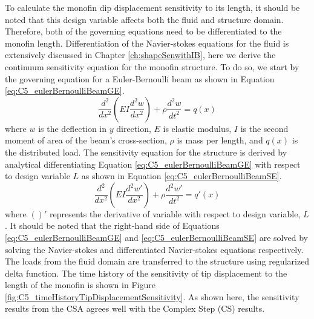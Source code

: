 %
To calculate the monofin dip displacement sensitivity to its length, it should be noted that this design variable affects both the fluid and structure domain. Therefore, both of the governing equations need to be differentiated to the monofin length. Differentiation of the Navier-stokes equations for the fluid is extensively discussed in Chapter \ref{ch:shapeSenwithIB}, here we derive the continuum sensitivity equation for the monofin structure. To do so, we start by the governing equation for a Euler-Bernoulli beam as shown in Equation \eqref{eq:C5_eulerBernoulliBeamGE}.
%
\begin{equation}\label{eq:C5_eulerBernoulliBeamGE}
	\frac{d^2}{dx^2}
	\left( EI \frac{d^2 w}{dx^2} \right) + \rho \frac{d^2 w}{dt^2} = q(x)
\end{equation}
%
where $w$ is the deflection in $y$ direction, $E$ is elastic modulus, $I$ is the second moment of area of the beam's cross-section, $\rho$ is mass per length, and $q(x)$ is the distributed load. The sensitivity equation for the structure is derived by analytical differentiating Equation \eqref{eq:C5_eulerBernoulliBeamGE} with respect to design variable $L$ as shown in Equation \eqref{eq:C5_eulerBernoulliBeamSE}.
%
\begin{equation}\label{eq:C5_eulerBernoulliBeamSE}
	\frac{d^2}{dx^2}
	\left( EI \frac{d^2 w'}{dx^2} \right) + \rho \frac{d^2 w'}{dt^2} = q'(x)
\end{equation}
%
where $( )'$ represents the derivative of variable with respect to design variable, $L$. It should be noted that the right-hand side of Equations \eqref{eq:C5_eulerBernoulliBeamGE} and \eqref{eq:C5_eulerBernoulliBeamSE} are solved by solving the Navier-stokes and differentiated Navier-stokes equations respectively. The loads from the fluid domain are transferred to the structure using regularized delta function. The time history of the sensitivity of tip displacement to the length of the monofin is shown in Figure \ref{fig:C5_timeHistoryTipDisplacementSensitivity}. As shown here, the sensitivity results from the CSA agrees well with the Complex Step (CS) results.
%
